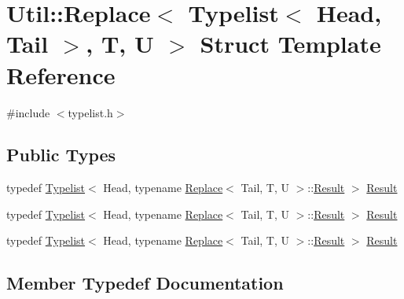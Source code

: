 \hypertarget{structUtil_1_1TL_1_1Replace_3_01Typelist_3_01Head_00_01Tail_01_4_00_01T_00_01U_01_4}{}\section{Util\+:\+:Replace$<$ Typelist$<$ Head, Tail $>$, T, U $>$ Struct Template Reference}
\label{structUtil_1_1TL_1_1Replace_3_01Typelist_3_01Head_00_01Tail_01_4_00_01T_00_01U_01_4}


{\ttfamily \#include $<$typelist.\+h$>$}

\subsection*{Public Types}
\begin{DoxyCompactItemize}
\item 
typedef \mbox{\hyperlink{structUtil_1_1Typelist}{Typelist}}$<$ Head, typename \mbox{\hyperlink{structUtil_1_1TL_1_1Replace}{Replace}}$<$ Tail, T, U $>$\+::\mbox{\hyperlink{structUtil_1_1TL_1_1Replace_3_01Typelist_3_01Head_00_01Tail_01_4_00_01T_00_01U_01_4_a218cadcba3503c01d97b4a6d4e65982c}{Result}} $>$ \mbox{\hyperlink{structUtil_1_1TL_1_1Replace_3_01Typelist_3_01Head_00_01Tail_01_4_00_01T_00_01U_01_4_a218cadcba3503c01d97b4a6d4e65982c}{Result}}
\item 
typedef \mbox{\hyperlink{structUtil_1_1Typelist}{Typelist}}$<$ Head, typename \mbox{\hyperlink{structUtil_1_1TL_1_1Replace}{Replace}}$<$ Tail, T, U $>$\+::\mbox{\hyperlink{structUtil_1_1TL_1_1Replace_3_01Typelist_3_01Head_00_01Tail_01_4_00_01T_00_01U_01_4_a218cadcba3503c01d97b4a6d4e65982c}{Result}} $>$ \mbox{\hyperlink{structUtil_1_1TL_1_1Replace_3_01Typelist_3_01Head_00_01Tail_01_4_00_01T_00_01U_01_4_a218cadcba3503c01d97b4a6d4e65982c}{Result}}
\item 
typedef \mbox{\hyperlink{structUtil_1_1Typelist}{Typelist}}$<$ Head, typename \mbox{\hyperlink{structUtil_1_1TL_1_1Replace}{Replace}}$<$ Tail, T, U $>$\+::\mbox{\hyperlink{structUtil_1_1TL_1_1Replace_3_01Typelist_3_01Head_00_01Tail_01_4_00_01T_00_01U_01_4_a218cadcba3503c01d97b4a6d4e65982c}{Result}} $>$ \mbox{\hyperlink{structUtil_1_1TL_1_1Replace_3_01Typelist_3_01Head_00_01Tail_01_4_00_01T_00_01U_01_4_a218cadcba3503c01d97b4a6d4e65982c}{Result}}
\end{DoxyCompactItemize}


\subsection{Member Typedef Documentation}
\mbox{\label{structUtil_1_1TL_1_1Replace_3_01Typelist_3_01Head_00_01Tail_01_4_00_01T_00_01U_01_4_a218cadcba3503c01d97b4a6d4e65982c}} 
